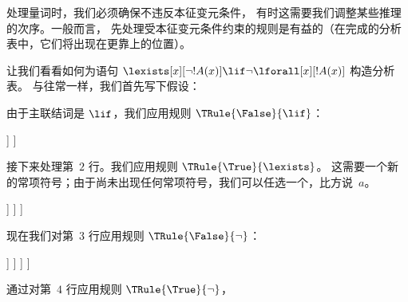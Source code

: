 \documentclass[../../../include/open-logic-section]{subfiles}
\begin{document}


\begin{ex}
处理量词时，我们必须确保不违反本征变元条件，
有时这需要我们调整某些推理的次序。一般而言，
先处理受本征变元条件约束的规则是有益的（在完成的分析表中，它们将出现在更靠上的位置）。

让我们看看如何为语句 $\lexists[x][\lnot !A(x)] \lif \lnot \lforall[x][!A(x)]$ 构造分析表。
与往常一样，我们首先写下假设：
\begin{oltableau}
[\sFmla{\False}{\lexists[x][\lnot \formula{A}(x)]\lif \lnot
    \lforall[x][\formula{A}(x)]}, just=\TAss]
\end{oltableau}
由于主联结词是 $\lif$，我们应用规则 $\TRule{\False}{\lif}$：
\begin{oltableau}
[\sFmla{\False}{\lexists[x][\lnot \formula{A}(x)]\lif \lnot
    \lforall[x][\formula{A}(x)]}, just=\TAss, checked
  [\sFmla{\True}{\lexists[x][\lnot \formula{A}(x)]},
    just={\TRule{\False}{\lif}[1]}
    [\sFmla{\False}{\lnot\lforall[x][\formula{A}(x)]},
      just={\TRule{\False}{\lif}[1]}]
  ]
]
\end{oltableau}
接下来处理第~$2$ 行。我们应用规则 $\TRule{\True}{\lexists}$。
这需要一个新的常项符号；由于尚未出现任何常项符号，我们可以任选一个，比方说~$a$。
\begin{oltableau}
[\sFmla{\False}{\lexists[x][\lnot \formula{A}(x)]\lif \lnot
    \lforall[x][\formula{A}(x)]}, just=\TAss, checked
  [\sFmla{\True}{\lexists[x][\lnot \formula{A}(x)]},
    just={\TRule{\False}{\lif}[1]}, checked
    [\sFmla{\False}{\lnot\lforall[x][\formula{A}(x)]},
      just={\TRule{\False}{\lif}[1]}
      [\sFmla{\True}{\lnot\formula{A}(a)}, just={\TRule{\True}{\lexists}[2]}]
    ]
  ]
]
\end{oltableau}
现在我们对第~$3$ 行应用规则 $\TRule{\False}{\lnot}$：
\begin{oltableau}
[\sFmla{\False}{\lexists[x][\lnot \formula{A}(x)]\lif \lnot
    \lforall[x][\formula{A}(x)]}, just=\TAss, checked
  [\sFmla{\True}{\lexists[x][\lnot \formula{A}(x)]},
    just={\TRule{\False}{\lif}[1]}, checked
    [\sFmla{\False}{\lnot\lforall[x][\formula{A}(x)]},
      just={\TRule{\False}{\lif}[1]}, checked
      [\sFmla{\True}{\lnot\formula{A}(a)}, just={\TRule{\True}{\lexists}[2]}
        [\sFmla{\True}{\lforall[x][\formula{A}(x)]},
          just = {\TRule{\False}{\lnot}[3]}
        ]
      ]
    ]
  ]
]
\end{oltableau}
通过对第~$4$ 行应用规则 $\TRule{\True}{\lnot}$，

\end{ex}
\end{document}
